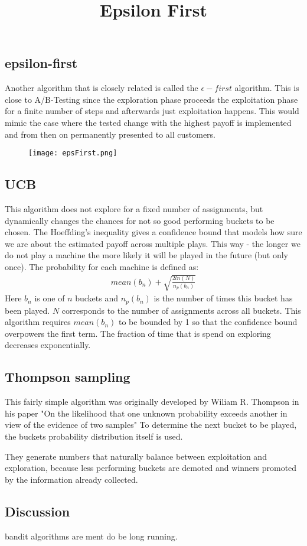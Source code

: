 \documentclass[main.tex]{subfiles}
\begin{document}
\subsection{epsilon-first}
Another algorithm that is closely related is called the $\epsilon-first$ algorithm. This is close to A/B-Testing since the exploration phase proceeds the exploitation phase for a finite number of steps and afterwards just exploitation happens. This would mimic the case where the tested change with the highest payoff is implemented and from then on permanently presented to all customers.
\begin{figure}[ht]
\texttt{[image: epsFirst.png]}
\centering
\title{Epsilon First}
\end{figure}

\subsection{UCB}
This algorithm does not explore for a fixed number of assignments, but dynamically changes the chances for not so good performing buckets to be chosen. The Hoeffding's inequality gives a confidence bound that models how sure we are about the estimated payoff across multiple plays. This way - the longer we do not play a machine the more likely it will be played in the future (but only once). The probability for each machine is defined as:
\begin{align*}
mean(b_n) + \sqrt{\frac{2ln(N)}{n_p(b_n)}}
\end{align*}
Here $b_n$ is one of $n$ buckets and $n_p(b_n)$ is the number of times this bucket has been played. $N$ corresponds to the number of assignments across all buckets. This algorithm requires $mean(b_n)$ to be bounded by 1 so that the confidence bound overpowers the first term. The fraction of time that is spend on exploring decreases exponentially.

\subsection{Thompson sampling}
This fairly simple algorithm was originally developed by Wiliam R. Thompson in his paper "On the likelihood that one unknown probability exceeds another in view of the evidence of two samples"
To determine the next bucket to be played, the buckets probability distribution itself is used.

They generate numbers that naturally balance between exploitation and exploration, because less performing buckets are demoted and winners promoted by the information already collected.

\subsection{Discussion}
bandit algorithms are ment do be long running.
\end{document}
